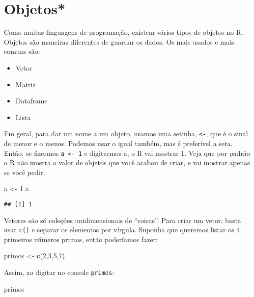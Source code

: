 \documentclass[]{book}
\newenvironment{Shaded}{\begin{snugshade}}{\end{snugshade}}
\newcommand{\KeywordTok}[1]{\textcolor[rgb]{0.13,0.29,0.53}{\textbf{#1}}}
\newcommand{\DecValTok}[1]{\textcolor[rgb]{0.00,0.00,0.81}{#1}}
\newcommand{\StringTok}[1]{\textcolor[rgb]{0.31,0.60,0.02}{#1}}
\newcommand{\NormalTok}[1]{#1}
\providecommand{\tightlist}{%
  \setlength{\itemsep}{0pt}\setlength{\parskip}{0pt}}
\begin{document}
\section{Objetos*}\label{objetos}

Como muitas linguagens de programação, existem vários tipos de objetos
no R. Objetos são maneiras diferentes de guardar os dados. Os mais
usados e mais comuns são:

\begin{itemize}
\tightlist
\item
  Vetor
\item
  Matriz
\item
  Dataframe
\item
  Lista
\end{itemize}

Em geral, para dar um nome a um objeto, usamos uma setinha,
\texttt{\textless{}-}, que é o sinal de menor e o menos. Podemos usar o
igual também, mas é preferível a seta. Então, se fizermos
\texttt{a\ \textless{}-\ 1} e digitarmos a, o R vai mostrar 1. Veja que
por padrão o R não mostra o valor de objetos que você acabou de criar, e
vai mostrar apenas se você pedir.

\begin{Shaded}
\begin{Highlighting}[]
\NormalTok{a <-}\StringTok{ }\DecValTok{1}
\NormalTok{a}
\end{Highlighting}
\end{Shaded}

\begin{verbatim}
## [1] 1
\end{verbatim}

Vetores são só coleções unidimensionais de ``coisas''. Para criar um
vetor, basta usar \texttt{c()} e separar os elementos por vírgula.
Suponha que queremos listar os 4 primeiros números primos, então
poderíamos fazer:

\begin{Shaded}
\begin{Highlighting}[]
\NormalTok{primos <-}\StringTok{ }\KeywordTok{c}\NormalTok{(}\DecValTok{2}\NormalTok{,}\DecValTok{3}\NormalTok{,}\DecValTok{5}\NormalTok{,}\DecValTok{7}\NormalTok{)}
\end{Highlighting}
\end{Shaded}

Assim, ao digitar no console \texttt{primos}:

\begin{Shaded}
\begin{Highlighting}[]
\NormalTok{primos}
\end{Highlighting}
\end{Shaded}
\end{document}
